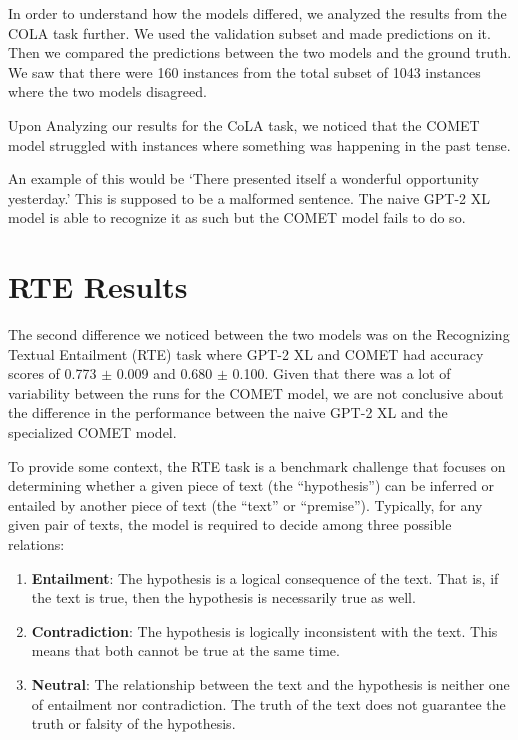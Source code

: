 \documentclass[\main/thesis.tex]{subfiles}
\begin{document}
In order to understand how the models differed, we analyzed the results from the COLA task further. 
We used the validation subset and made predictions on it. Then we compared the predictions between
the two models and the ground truth. We saw that there were 160 instances from the total 
subset of 1043 instances where the two models disagreed. 

Upon Analyzing our results for the CoLA task, we noticed that the COMET 
model struggled with instances where something was happening in the past tense.

An example of this would be `There presented itself a wonderful opportunity yesterday.' 
This is supposed to be a malformed sentence. The naive GPT-2 XL model is able to 
recognize it as such but the COMET model fails to do so. 

\section{RTE Results}\label{sec:rte_results}

The second difference we noticed between the two models was on the Recognizing Textual Entailment (RTE) task where GPT-2 XL
 and COMET had accuracy scores of 0.773 $\pm$ 0.009 and 0.680 $\pm$ 0.100. Given that
there was a lot of variability between the runs for the COMET model, we are not conclusive
about the difference in the performance between the naive GPT-2 XL and the specialized
COMET model. 

To provide some context, the RTE task is a benchmark challenge 
that focuses on determining whether a given piece of text (the ``hypothesis'') can be inferred or 
entailed by another piece of text (the ``text'' or ``premise''). Typically, for any given pair of texts, 
the model is required to decide among three possible relations:

\begin{enumerate}
    \item \textbf{Entailment}: The hypothesis is a logical consequence of the text. That is, 
    if the text is true, then the hypothesis is necessarily true as well.
    \item \textbf{Contradiction}: The hypothesis is logically inconsistent with the text. 
    This means that both cannot be true at the same time.
    \item \textbf{Neutral}: The relationship between the text and the hypothesis is neither one of entailment nor contradiction. 
    The truth of the text does not guarantee the truth or falsity of the hypothesis.
\end{enumerate}
\end{document}
